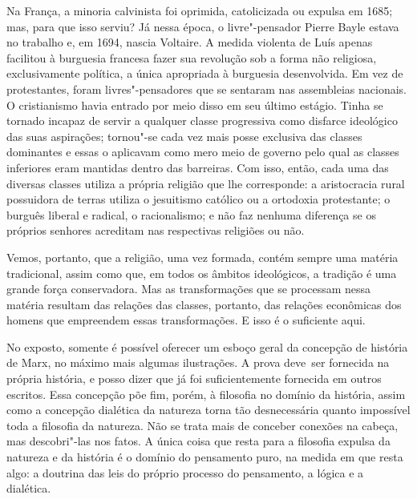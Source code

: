 Na França, a minoria calvinista foi oprimida, catolicizada ou expulsa em
1685; mas, para que isso serviu? Já nessa época, o
livre"-pensador Pierre
Bayle estava no trabalho e, em 1694,
nascia Voltaire.
A medida violenta
de Luís  apenas facilitou à burguesia francesa fazer sua
revolução sob a forma não religiosa, exclusivamente política, a única
apropriada à burguesia desenvolvida. Em vez de protestantes, foram
livres"-pensadores que se sentaram nas assembleias nacionais. O
cristianismo havia entrado por meio disso em seu último estágio. Tinha
se tornado incapaz de servir a qualquer classe progressiva como disfarce
ideológico das suas aspirações; tornou"-se cada vez mais posse exclusiva
das classes dominantes e essas o aplicavam como mero meio de governo
pelo qual as classes inferiores eram mantidas dentro das barreiras. Com
isso, então, cada uma das diversas classes utiliza a própria religião
que lhe corresponde: a aristocracia rural possuidora de 
terras utiliza o jesuitismo católico ou a ortodoxia protestante; o
burguês liberal e radical, o racionalismo; e não faz nenhuma diferença
se os próprios senhores acreditam nas respectivas religiões ou não.

Vemos, portanto, que a religião, uma vez formada, contém sempre uma
matéria tradicional, assim como que, em todos os âmbitos ideológicos, a
tradição é uma grande força conservadora. Mas as transformações que se
processam nessa matéria resultam das relações das classes, portanto,
das relações econômicas dos homens que empreendem essas transformações.
E isso é o suficiente aqui.

No exposto, somente é possível oferecer um esboço geral da concepção de
história de Marx, no máximo mais algumas ilustrações. A prova deve\est\ ser
fornecida na própria história, e posso dizer que já foi suficientemente
fornecida em outros escritos. Essa concepção põe fim, porém, à filosofia
no domínio da história, assim como a concepção dialética da natureza
torna tão desnecessária quanto impossível toda a filosofia da natureza.
Não se trata mais de conceber conexões na cabeça, mas descobri"-las nos
fatos. A única coisa que resta para a filosofia expulsa da natureza e da
história é o domínio do pensamento puro, na medida em que resta algo: a
doutrina das leis do próprio processo do pensamento, a lógica e a
dialética.

\asterisc

